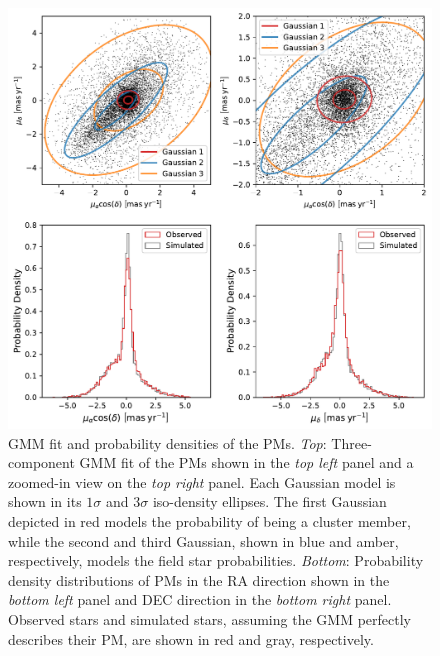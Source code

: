 \documentclass[12pt]{ucsddissertation}
\begin{document}
\begin{CJK*}{UTF8}{gbsn}
\begin{figure}[htb!]
\centering
\includegraphics[width = \linewidth]{figures/chapter2/4_panel_VPD_Distributions.pdf}
\caption[Gaussian mixture model fit and probability densities of the proper motions]{GMM fit and probability densities of the PMs. \emph{Top}: Three-component GMM fit of the PMs shown in the \emph{top left} panel and a zoomed-in view on the \emph{top right} panel. Each Gaussian model is shown in its $1\sigma$ and $3\sigma$ iso-density ellipses. The first Gaussian depicted in red models the probability of being a cluster member, while the second and third Gaussian, shown in blue and amber, respectively, models the field star probabilities. \emph{Bottom}: Probability density distributions of PMs in the RA direction shown in the \emph{bottom left} panel and DEC direction in the \emph{bottom right} panel. Observed stars and simulated stars, assuming the GMM perfectly describes their PM, are shown in red and gray, respectively.}
\label{fig:wd1_vpd_distribution}
\end{figure}



\end{CJK*}
\end{document}
